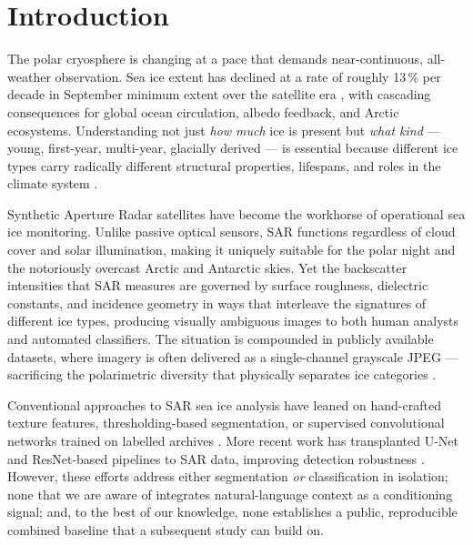 \documentclass[remotesensing,article,accept,moreauthors,pdftex]{Definitions/mdpi}
\begin{document}
\section{Introduction}
\label{sec:intro}


The polar cryosphere is changing at a pace that demands near-continuous, all-
weather observation. Sea ice extent has declined at a rate of roughly
13\,\% per decade in September minimum extent over the satellite era
\cite{comiso2012large}, with cascading consequences for global ocean
circulation, albedo feedback, and Arctic ecosystems. Understanding not just
\emph{how much} ice is present but \emph{what kind} — young, first-year,
multi-year, glacially derived — is essential because different ice types carry
radically different structural properties, lifespans, and roles in the climate
system \cite{maslanik2011distribution,petty2018arctic}.

Synthetic Aperture Radar satellites have become the workhorse of operational
sea ice monitoring. Unlike passive optical sensors, SAR functions regardless of
cloud cover and solar illumination, making it uniquely suitable for the polar
night and the notoriously overcast Arctic and Antarctic skies. Yet the
backscatter intensities that SAR measures are governed by surface roughness,
dielectric constants, and incidence geometry in ways that interleave the
signatures of different ice types, producing visually ambiguous images to
both human analysts and automated classifiers. The situation is compounded
in publicly available datasets, where imagery is often delivered as a
single-channel grayscale JPEG — sacrificing the polarimetric diversity that
physically separates ice categories \cite{ulaby1990microwave}.

Conventional approaches to SAR sea ice analysis have leaned on hand-crafted
texture features, thresholding-based segmentation, or supervised convolutional
networks trained on labelled archives \cite{brekke2005sea,leigh2014automated}.
More recent work has transplanted U-Net \cite{ronneberger2015unet} and
ResNet-based pipelines to SAR data, improving detection robustness
\cite{liu2021deep}. However, these efforts address either segmentation
\emph{or} classification in isolation; none that we are aware of integrates
natural-language context as a conditioning signal; and, to the best of our
knowledge, none establishes a public, reproducible combined baseline that a
subsequent study can build on.
\end{document}
